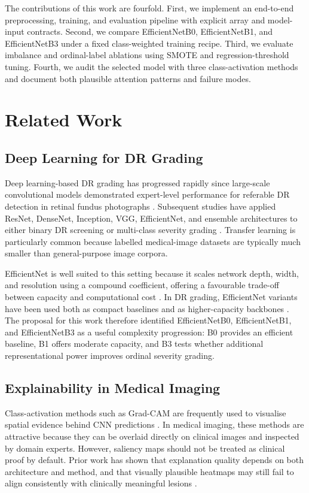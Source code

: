 \documentclass[11pt,a4paper]{article}
\begin{document}
The contributions of this work are fourfold. First, we implement an end-to-end preprocessing, training, and evaluation pipeline with explicit array and model-input contracts. Second, we compare EfficientNetB0, EfficientNetB1, and EfficientNetB3 under a fixed class-weighted training recipe. Third, we evaluate imbalance and ordinal-label ablations using SMOTE and regression-threshold tuning. Fourth, we audit the selected model with three class-activation methods and document both plausible attention patterns and failure modes.

\section{Related Work}
\subsection{Deep Learning for DR Grading}
Deep learning-based DR grading has progressed rapidly since large-scale convolutional models demonstrated expert-level performance for referable DR detection in retinal fundus photographs \cite{gulshan2016,ting2017}. Subsequent studies have applied ResNet, DenseNet, Inception, VGG, EfficientNet, and ensemble architectures to either binary DR screening or multi-class severity grading \cite{atwany2022}. Transfer learning is particularly common because labelled medical-image datasets are typically much smaller than general-purpose image corpora.

EfficientNet is well suited to this setting because it scales network depth, width, and resolution using a compound coefficient, offering a favourable trade-off between capacity and computational cost \cite{efficientnet}. In DR grading, EfficientNet variants have been used both as compact baselines and as higher-capacity backbones \cite{chetoui2020,vijayan2023}. The proposal for this work therefore identified EfficientNetB0, EfficientNetB1, and EfficientNetB3 as a useful complexity progression: B0 provides an efficient baseline, B1 offers moderate capacity, and B3 tests whether additional representational power improves ordinal severity grading.

\subsection{Explainability in Medical Imaging}
Class-activation methods such as Grad-CAM are frequently used to visualise spatial evidence behind CNN predictions \cite{gradcam}. In medical imaging, these methods are attractive because they can be overlaid directly on clinical images and inspected by domain experts. However, saliency maps should not be treated as clinical proof by default. Prior work has shown that explanation quality depends on both architecture and method, and that visually plausible heatmaps may still fail to align consistently with clinically meaningful lesions \cite{ayhan2022}.
\end{document}
